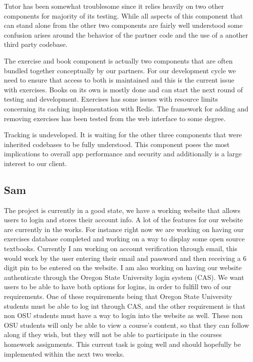 \documentclass[onecolumn, draftclsnofoot,10pt, compsoc]{IEEEtran}
\begin{document}
Tutor has been somewhat troublesome since it relies heavily on two other components for majority of its testing. While all aspects of this component that can stand alone from the other two components are fairly well understood some confusion arises around the behavior of the partner code and the use of a another third party codebase.

The exercise and book component is actually two components that are often bundled together conceptually by our partners. For our development cycle we need to ensure that access to both is maintained and this is the current issue with exercises. Books on its own is mostly done and can start the next round of testing and development. Exercises has some issues with resource limits concerning its caching implementation with Redis. The framework for adding and removing exercises has been tested from the web interface to some degree. 

Tracking is undeveloped. It is waiting for the other three components that were inherited codebases to be fully understood. This component poses the most implications to overall app performance and security and additionally is a large interest to our client. 

\subsection{Sam}
The project is currently in a good state, we have a working website that allows users to login and stores their account info. A lot of the features for our website are currently in the works. For instance right now we are working on having our exercises database completed and working on a way to display some open source textbooks. Currently I am working on account verification through email, this would work by the user entering their email and password and then receiving a 6 digit pin to be entered on the website. I am also working on having our website authenticate through the Oregon State University login system (CAS). We want users to be able to have both options for logins, in order to fulfill two of our requirements. One of these requirements being that Oregon State University students must be able to log int through CAS, and the other requirement is that non OSU students must have a way to login into the website as well. These non OSU students will only be able to view a course’s content, so that they can follow along if they wish, but they will not be able to participate in the courses homework assignments. This current task is going well and should hopefully be implemented within the next two weeks. 
\end{document}
